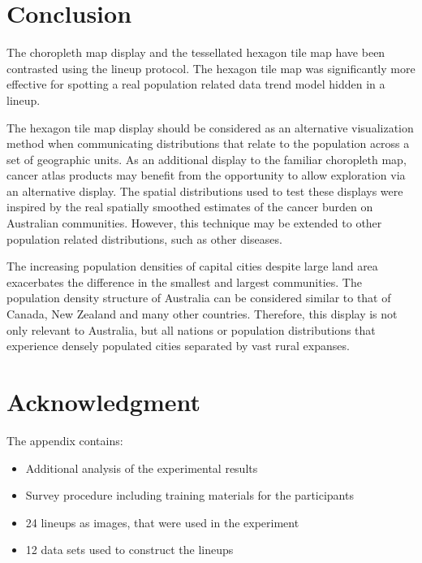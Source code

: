 \documentclass{monashthesis}
\begin{document}
\hypertarget{conclusion-1}{%
\section{Conclusion}\label{conclusion-1}}

The choropleth map display and the tessellated hexagon tile map have been contrasted using the lineup protocol. The hexagon tile map was significantly more effective for spotting a real population related data trend model hidden in a lineup.

The hexagon tile map display should be considered as an alternative visualization method when communicating distributions that relate to the population across a set of geographic units. As an additional display to the familiar choropleth map, cancer atlas products may benefit from the opportunity to allow exploration via an alternative display. The spatial distributions used to test these displays were inspired by the real spatially smoothed estimates of the cancer burden on Australian communities. However, this technique may be extended to other population related distributions, such as other diseases.

The increasing population densities of capital cities despite large land area exacerbates the difference in the smallest and largest communities.
The population density structure of Australia can be considered similar to that of Canada, New Zealand and many other countries. Therefore, this display is not only relevant to Australia, but all nations or population distributions that experience densely populated cities separated by vast rural expanses.

\hypertarget{acknowledgment}{%
\section{Acknowledgment}\label{acknowledgment}}

The appendix contains:

\begin{itemize}
\tightlist
\item
  Additional analysis of the experimental results
\item
  Survey procedure including training materials for the participants
\item
  24 lineups as images, that were used in the experiment
\item
  12 data sets used to construct the lineups
\end{itemize}
\end{document}
